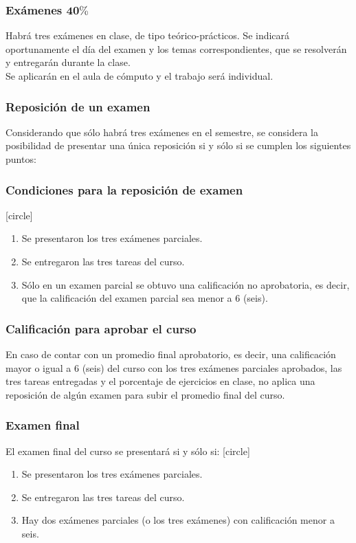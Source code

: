 \documentclass[12pt]{beamer}
\begin{document}
\begin{frame}
\frametitle{Exámenes $\mathbf{40\%}$}
Habrá tres exámenes en clase, de tipo teórico-prácticos. Se indicará oportunamente el día del examen y los temas correspondientes, que se resolverán y entregarán durante la clase.
\\
\bigskip
Se aplicarán en el aula de cómputo y el trabajo será individual.
\end{frame}
\begin{frame}
\frametitle{Reposición de un examen}
Considerando que sólo habrá tres exámenes en el semestre, se considera la posibilidad de presentar una única reposición si y sólo si se cumplen los siguientes puntos:
\end{frame}
\begin{frame}
\frametitle{Condiciones para la reposición de examen}
[circle]
\begin{enumerate}[<+->]
\item Se presentaron los tres exámenes parciales.
\item Se entregaron las tres tareas del curso.
\item Sólo en un examen parcial se obtuvo una calificación no aprobatoria, es decir, que la calificación del examen parcial sea menor a $6$ (seis).
\end{enumerate}
\end{frame}
\begin{frame}
\frametitle{Calificación para aprobar el curso}
En caso de contar con un promedio final aprobatorio, es decir, una calificación mayor o igual a $6$ (seis) del curso con los tres exámenes parciales aprobados, las tres tareas entregadas y el porcentaje de ejercicios en clase, \alert{no aplica una reposición de algún examen} para subir el promedio final del curso.
\end{frame}
\begin{frame}
\frametitle{Examen final}
El examen final del curso se presentará si y sólo si:
[circle]
\begin{enumerate}[<+->]
\item Se presentaron los tres exámenes parciales.
\item Se entregaron las tres tareas del curso.
\item Hay dos exámenes parciales (o los tres exámenes) con calificación menor a seis.
\end{enumerate}
\end{frame}
\end{document}
